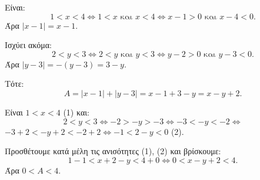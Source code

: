
\begin{alist}
\item Είναι:
\[1 < x < 4 \Leftrightarrow 1 < x \text{ και } x < 4 \Leftrightarrow x - 1 > 0 \text{ και } x - 4 < 0.\]
Άρα $|x - 1| = x - 1$.

Ισχύει ακόμα:
\[2 < y < 3 \Leftrightarrow 2 < y \text{ και } y < 3 \Leftrightarrow y - 2 > 0 \text{ και } y - 3 < 0.\]
Άρα $|y - 3| = -(y - 3) = 3 - y$.

Τότε:
\[A = |x - 1| + |y - 3| = x - 1 + 3 - y = x - y + 2.\]

\item Είναι $1 < x < 4$ (1) και:
\[2 < y < 3 \Leftrightarrow -2 > -y > -3 \Leftrightarrow -3 < -y < -2 \Leftrightarrow\]
$-3 + 2 < -y + 2 < -2 + 2 \Leftrightarrow -1 < 2 - y < 0$ (2).

Προσθέτουμε κατά μέλη τις ανισότητες (1), (2) και βρίσκουμε:
\[1 - 1 < x + 2 - y < 4 + 0 \Leftrightarrow 0 < x - y + 2 < 4.\]
Άρα $0 < A < 4$.
\end{alist}

